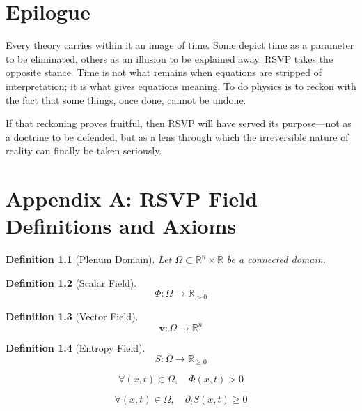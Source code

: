 \documentclass[11pt,oneside]{book}
\newtheorem{definition}{Definition}[chapter]
\begin{document}
\backmatter

\chapter*{Epilogue}

Every theory carries within it an image of time. Some depict time as a parameter to be eliminated, others as an illusion to be explained away. RSVP takes the opposite stance. Time is not what remains when equations are stripped of interpretation; it is what gives equations meaning. To do physics is to reckon with the fact that some things, once done, cannot be undone.

If that reckoning proves fruitful, then RSVP will have served its purpose—not as a doctrine to be defended, but as a lens through which the irreversible nature of reality can finally be taken seriously.

\appendix
\setcounter{chapter}{0}

\chapter{Appendix A: RSVP Field Definitions and Axioms}

\begin{definition}[Plenum Domain]
Let $\Omega \subset \mathbb{R}^n \times \mathbb{R}$ be a connected domain.
\end{definition}

\begin{definition}[Scalar Field]
\[
\Phi : \Omega \to \mathbb{R}_{>0}
\]
\end{definition}

\begin{definition}[Vector Field]
\[
\mathbf{v} : \Omega \to \mathbb{R}^n
\]
\end{definition}

\begin{definition}[Entropy Field]
\[
S : \Omega \to \mathbb{R}_{\ge 0}
\]
\end{definition}

\begin{axiom}
\[
\forall (x,t)\in\Omega,\quad \Phi(x,t) > 0
\]
\end{axiom}

\begin{axiom}
\[
\forall (x,t)\in\Omega,\quad \partial_t S(x,t) \ge 0
\]
\end{axiom}
\end{document}
